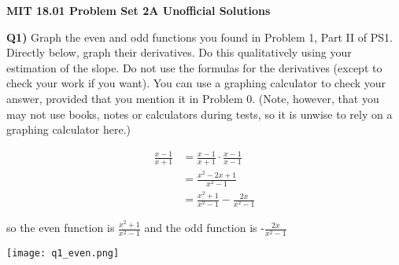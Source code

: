 \documentclass[9pt]{article}
\begin{document}
\begin{center}
  \large\textbf{MIT 18.01 Problem Set 2A Unofficial Solutions}
\end{center}

\begin{tcolorbox}
  \textbf{Q1)} Graph the even and odd functions you found in Problem 1, Part II of PS1. Directly below, graph their derivatives. Do this qualitatively using your estimation of the slope. Do not use the formulas for the derivatives (except to check your work if you want). You can use a graphing calculator to check your answer, provided that you mention it in Problem 0. (Note, however, that you may not use books, notes or calculators during tests, so it is unwise to rely on a graphing calculator here.)
\end{tcolorbox}

\begin{align*}
  \frac{x - 1}{x + 1} &= \frac{x - 1}{x + 1} \cdot \frac{x - 1}{x - 1}\\
                      &= \frac{x^2 - 2x + 1}{x^2 - 1}\\
                      &= \frac{x^2 + 1}{x^2 - 1} - \frac{2x}{x^2 - 1}
\end{align*}

so the even function is $\frac{x^2 + 1}{x^2 - 1}$ and the odd function is -$\frac{2x}{x^2 - 1}$

\begin{center}
  \texttt{[image: q1\_even.png]}
\end{center}
\end{document}
